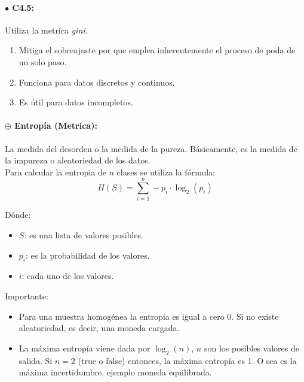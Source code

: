 \documentclass[../main.tex]{subfiles}
\begin{document}
                \paragraph{$\bullet$ C4.5:}
                Utiliza la metrica \textit{gini}.
            
                \begin{enumerate}
                    \item Mitiga el sobreajuste por que emplea inherentemente el proceso de poda de un solo paso.
                    \item Funciona para datos discretos y continuos.
                    \item Es útil para datos incompletos.
                \end{enumerate}
            

            \paragraph{$\oplus$ Entropía (Metrica):}
                La medida del desorden o la medida de la pureza. Básicamente, es la medida de la impureza o aleatoriedad de los datos.\\
                
                Para calcular la entropia de $n$ clases se utiliza la fórmula:
                \begin{equation}
                    H(S) = \sum_{i=1}^{n} -p_i \cdot  \log_2(p_i)
                \end{equation}
            
                Dónde:
                \begin{itemize}
                    \item $S$: es una lista de valores posibles.
                    \item $p_i$: es la probabilidad de los valores.
                    \item $i$: cada uno de los valores.
                \end{itemize}
            
                Importante:
                \begin{itemize}
                    \item Para una muestra homogénea la entropia es igual a cero 0. Si no existe aleatoriedad, es decir, una moneda cargada.
                    \item La máxima entropía viene dada por $\log_2(n)$, $n$ son los posibles valores de salida. Si $n=2$ (true o false) entonces, la máxima entropía es 1. O sea es la máxima incertidumbre, ejemplo moneda equilibrada.
                \end{itemize}
            
\end{document}
